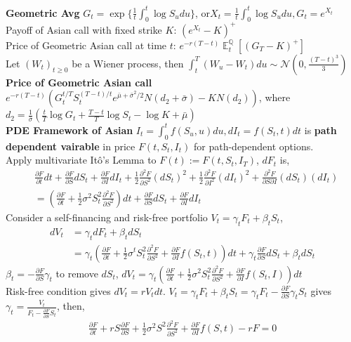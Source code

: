 \documentclass[10pt,landscape, a4paper]{article}
\theoremstyle{remark}
\newcommand{\E}{\operatorname{\mathbb{E}}}
\newcommand{\Q}{\mathbb{Q}}
\begin{document}
\begin{multicols*}{3}
\textbf{Geometric Avg} $G_t = \exp \{\frac{1}{t} \int^t_0 \log S_u du \}$, or$X_t = \frac{1}{t} \int^t_0 \log S_u du, G_t = e^{X_t}$\\
Payoff of Asian call with fixed strike $K$: $(e^{X_t} -K)^+$\\
Price of Geometric Asian call at time $t$: $e^{-r(T-t)} \E^{\Q}_t [(G_T - K)^+]$\\
Let $(W_t)_{t \geq 0}$ be a Wiener process, then $\int^T_t (W_u -W_t) du \sim \mathcal{N} (0, \frac{(T-t)^3}{3})$\\

\textbf{Price of Geometric Asian call} $e^{-r(T-t)} \left(G^{t/T}_t S^{(T-t)/t}_{t} e^{\bar{\mu} + \bar{\sigma}^2/2} N(d_2 + \bar{\sigma}) - KN(d_2) \right)$, where $d_2 = \frac{1}{\bar{\sigma}} \left(\frac{t}{T}\log G_t + \frac{T-t}{T} \log S_t - \log K + \bar{\mu} \right)$\\

\textbf{PDE Framework of Asian} $I_t = \int^t_0 f(S_u, u) du, dI_t = f(S_t, t) dt$ is \textbf{path dependent vairable} in price $F(t, S_t, I_t)$ for path-dependent options.\\
Apply multivariate It\^{o}'s Lemma to $F(t) := F(t, S_t, I_T)$, $dF_t$ is,
\begin{align*}
    &\frac{\partial F}{\partial t} dt + \frac{\partial F}{\partial S} dS_t + \frac{\partial F}{\partial I} dI_t + \frac{1}{2} \frac{\partial^2 F}{\partial S^2} (d S_t)^2 + \frac{1}{2} \frac{\partial^2 F}{\partial I^2} (dI_t)^2 + \frac{\partial^2 F}{\partial S \partial I} (dS_t) (dI_t) \\
    &= \left(\frac{\partial F}{\partial t} + \frac{1}{2} \sigma^2 S^2_t \frac{\partial^2 F}{\partial S^2} \right) dt + \frac{\partial F}{\partial S} dS_t + \frac{\partial F}{\partial I} dI_t
\end{align*}
Consider a self-financing and risk-free portfolio $V_t = \gamma_t F_t + \beta_t S_t$, 
\begin{align*}
    dV_t &= \gamma_t dF_t + \beta_t dS_t \\
    &= \gamma_t \left(\frac{\partial F}{\partial t} + \frac{1}{2} \sigma^t S^2_t \frac{\partial^2 F}{\partial S^2} + \frac{\partial F}{\partial I} f(S_t, t) \right) dt + \gamma_t \frac{\partial F}{\partial S} dS_t + \beta_t d S_t
\end{align*}
$\beta_t = - \frac{\partial F}{\partial S} \gamma_t$ to remove $dS_t$, $dV_t = \gamma_t \left(\frac{\partial F}{\partial t} +\frac{1}{2} \sigma^2 S^2_t \frac{\partial^2 F}{\partial S^2} +\frac{\partial F}{\partial I} f(S_t, I) \right) dt$\\
Risk-free condition gives $dV_t = rV_t dt$. $V_t = \gamma_t F_t + \beta_t S_t = \gamma_t F_t - \frac{\partial F}{\partial S}\gamma_t S_t$ gives $\gamma_t = \frac{V_t}{F_t - \frac{\partial F}{\partial S}S_t }$, then,
\begin{align*}
    \frac{\partial F}{\partial t} + r S \frac{\partial F}{\partial S} + \frac{1}{2} \sigma^2 S^2 \frac{\partial^2 F}{\partial S^2} + \frac{\partial F}{\partial I} f(S, t) - rF = 0
\end{align*}



\end{multicols*}
\end{document}
